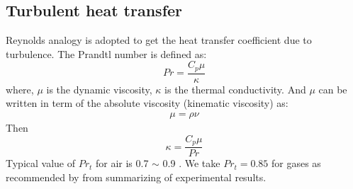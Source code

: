 \subsection{Turbulent heat transfer}
Reynolds analogy is adopted to get the heat transfer coefficient due to turbulence.
The Prandtl number is defined as:
\begin{equation}
Pr=\dfrac{C_p \mu}{\kappa}
\end{equation}
where, $\mu$ is the dynamic viscosity, $\kappa$ is the thermal conductivity. And $\mu$  can be written in term of the absolute viscosity (kinematic viscosity) as:
\begin{align}
\mu=\rho \nu
\end{align}
Then
\begin{equation}
\kappa=\dfrac{C_p \mu}{Pr}
\end{equation}
Typical value of $Pr_t$ for air is 0.7 $\sim$ 0.9 . We take $Pr_t=0.85$ for gases as recommended by \citet{kays1994turbulent} from summarizing of experimental results. 

